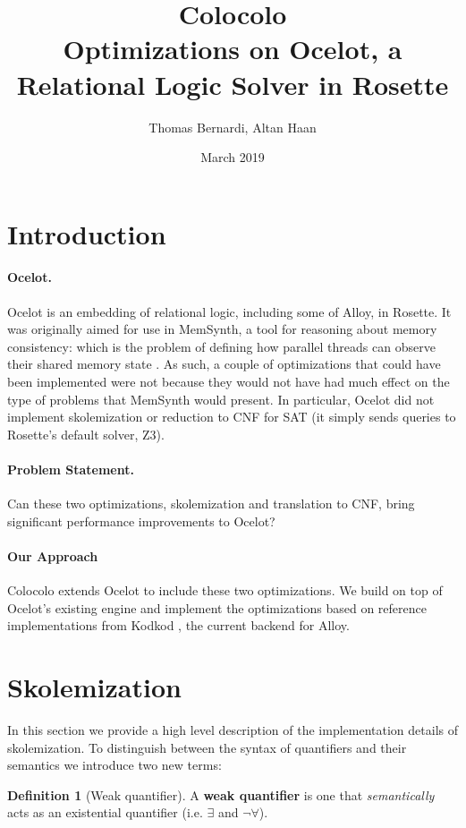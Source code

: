 \documentclass[10pt]{article}
\title{Colocolo\\\large Optimizations on Ocelot, a Relational Logic Solver in Rosette}
\date{March 2019}
\author{Thomas Bernardi, Altan Haan}
\theoremstyle{definition}
\newtheorem{definition}{Definition}[section]
\begin{document}
	\maketitle

  \section{Introduction}

  \paragraph{Ocelot.} Ocelot is an embedding of relational logic, including some of Alloy, in Rosette. It was originally aimed for use in MemSynth, a tool for reasoning about memory consistency: which is the problem of defining how parallel threads can observe their shared memory state \cite{bornholdt17}. As such, a couple of optimizations that could have been implemented were not because they would not have had much effect on the type of problems that MemSynth would present. In particular, Ocelot did not implement skolemization or reduction to CNF for SAT (it simply sends queries to Rosette's default solver, Z3).

  \paragraph{Problem Statement.} Can these two optimizations, skolemization and translation to CNF, bring significant performance improvements to Ocelot?
  
  \paragraph{Our Approach} Colocolo extends Ocelot to include these two optimizations. We build on top of Ocelot's existing engine and implement the optimizations based on reference implementations from Kodkod \cite{torlak07}, the current backend for Alloy.

  \section{Skolemization}\label{sec:skolems}
  In this section we provide a high level description of the implementation details of skolemization. To distinguish between the syntax of quantifiers and their semantics we introduce two new terms:\\
  \theoremstyle{definition}
  \begin{definition}[Weak quantifier]
      A \textbf{weak quantifier} is one that \emph{semantically} acts as an existential quantifier (i.e. $\exists$ and $\neg \forall$).
  \end{definition}
\end{document}
